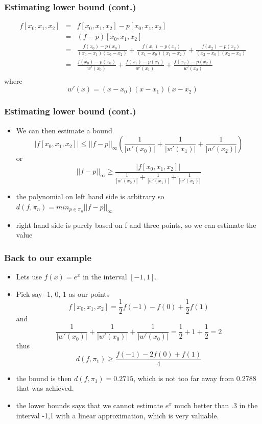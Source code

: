 \documentclass[10pt]{beamer}
\begin{document}
\begin{frame}
  \frametitle{Estimating lower bound (cont.)}
    \[
      \begin{array}{rcl}
        f[x_0, x_1, x_2] &=&  f[x_0, x_1, x_2] -  p[x_0, x_1, x_2]\\ 
                         &=&  (f-p)[x_0, x_1, x_2]\\ 
                         &=& \frac{f(x_0)-p(x_0)}{(x_0-x_1)(x_0-x_2)}+
                             \frac{f(x_1)-p(x_1)}{(x_1-x_0)(x_1-x_2)}+
                             \frac{f(x_2)-p(x_2)}{(x_2-x_0)(x_2-x_1)}\\
                         &=& \frac{f(x_0)-p(x_0)}{w'(x_0)}+
                             \frac{f(x_1)-p(x_1)}{w'(x_1)}+
                             \frac{f(x_2)-p(x_2)}{w'(x_2)}\\
      \end{array}      
    \] where
    \[
      w'(x) = (x-x_0)(x-x_1)(x-x_2)
    \]
\end{frame}

\begin{frame}
  \frametitle{Estimating lower bound (cont.)}
  \begin{itemize}
  \item We can then estimate a bound
    \[
      | f[x_0,x_1,x_2] | \leq ||f-p||_{\infty}
      \left( \frac{1}{|w'(x_0)|} + \frac{1}{|w'(x_1)|} + \frac{1}{|w'(x_2)|} \right)
    \] or
    \[
      ||f-p||_{\infty} \geq \frac{| f[x_0,x_1,x_2] | }{\frac{1}{|w'(x_0)|} + \frac{1}{|w'(x_1)|} + \frac{1}{|w'(x_2)|}}
    \]
  \item the polynomial on left hand side is arbitrary so $d(f,\pi_n) = min_{p\in \pi_n}||f-p||_{\infty}$
  \item right hand side is purely based on f and three points, so we can estimate the value
  \end{itemize}
\end{frame}

\begin{frame}
  \frametitle{Back to our example}
  \begin{itemize}
  \item Lets use $f(x) = e^x$ in the interval $[-1,1]$. 
  \item Pick say -1, 0, 1 as our points
    \[
      f[x_0,x_1,x_2] = \frac{1}{2} f(-1) - f(0) + \frac{1}{2} f(1)
    \] and
    \[
      \frac{1}{|w'(x_0)|} + \frac{1}{|w'(x_0)|} + \frac{1}{|w'(x_0)|} = \frac{1}{2} + 1 + \frac{1}{2} = 2
    \] thus
    \[
      d(f,\pi_1) \geq \frac{f(-1) - 2 f(0) + f(1)}{4} 
    \]
  \item the bound is then $d(f,\pi_1) = 0.2715$, which is not too far away from 0.2788 that was achieved. 
  \item the lower bounds says that we cannot estimate $e^x$ much
    better than .3 in the interval -1,1 with a linear approximation,
    which is very valuable.
  \end{itemize}
\end{frame}
\end{document}
